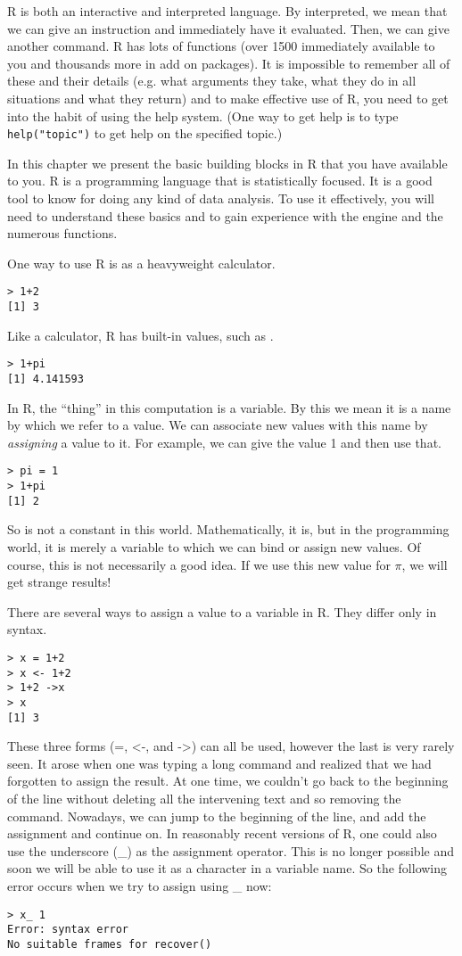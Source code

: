 R is both an interactive and interpreted language. By interpreted, we
mean that we can give an instruction and immediately have it
evaluated. Then, we can give another command.  R has lots of functions
(over 1500 immediately available to you and thousands more in add on
packages). It is impossible to remember all of these and their details
(e.g. what arguments they take, what they do in all situations and
what they return) and to make effective use of R, you need to get into
the habit of using the help system. (One way to get help is to type
\verb|help("topic")| to get help on the specified topic.)

In this chapter we present the basic building blocks in R that you
have available to you.  R is a programming language that is
statistically focused. It is a good tool to know for doing any kind of
data analysis. To use it effectively, you will need to understand
these basics and to gain experience with the engine and the numerous
functions.

One way to use R is as a heavyweight calculator. 
\begin{verbatim}
> 1+2
[1] 3
\end{verbatim}
Like a calculator, R has built-in values, such as . 
\begin{verbatim}
> 1+pi
[1] 4.141593
\end{verbatim}   
In R, the  ``thing'' in this computation is a
variable. By this we mean it is a name by which we refer to a
value. We can associate new values with this name by
{\em{assigning}} a value to it. For example, we can give
 the value 1 and then use that.
\begin{verbatim}
> pi = 1
> 1+pi
[1] 2
\end{verbatim}
So  is not a constant in this world. Mathematically, it
is, but in the programming world, it is merely a variable to which we
can bind or assign new values. Of course, this is not necessarily a
good idea. If we use this new value for $\pi$, we will get strange
results!

There are several ways to assign a value to a variable in R. They
differ only in syntax.
\begin{verbatim}
> x = 1+2
> x <- 1+2
> 1+2 ->x
> x
[1] 3
\end{verbatim}
These three forms (=, \textless{}-, and -\textgreater{}) can all be
used, however the last is very rarely seen. It arose when one was
typing a long command and realized that we had forgotten to assign the
result. At one time, we couldn't go back to the beginning of the line
without deleting all the intervening text and so removing the
command. Nowadays, we can jump to the beginning of the line, and add
the assignment and continue on. In reasonably recent versions of R,
one could also use the underscore (\_) as the assignment
operator. This is no longer possible and soon we will be able to use
it as a character in a variable name. So the following error occurs
when we try to assign using \_ now:
\begin{verbatim}
> x_ 1
Error: syntax error
No suitable frames for recover()
\end{verbatim}


